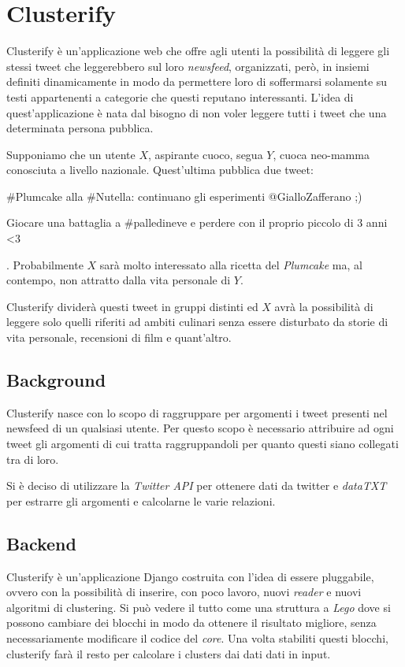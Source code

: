 \chapter{Clusterify}
	Clusterify è un'applicazione web che offre agli utenti la possibilità di leggere gli stessi tweet che leggerebbero sul loro \emph{newsfeed}, organizzati, però, in insiemi definiti dinamicamente in modo da permettere loro di soffermarsi solamente su testi appartenenti a categorie che questi reputano interessanti. L'idea di quest'applicazione è nata dal bisogno di non voler leggere tutti i tweet che una determinata persona pubblica. 

	Supponiamo che un utente $X$, aspirante cuoco, segua $Y$, cuoca neo-mamma conosciuta a livello nazionale. Quest'ultima pubblica due tweet:
	\begin{inparaenum}[\itshape 1\upshape)]
		\item \#Plumcake alla \#Nutella: continuano gli esperimenti @GialloZafferano ;)
		\item Giocare una battaglia a \#palledineve e perdere con il proprio piccolo di 3 anni <3
	\end{inparaenum}.
	Probabilmente $X$ sarà molto interessato alla ricetta del \emph{Plumcake} ma, al contempo, non attratto dalla vita personale di $Y$.

	Clusterify dividerà questi tweet in gruppi distinti ed $X$ avrà la possibilità di leggere solo quelli riferiti ad ambiti culinari senza essere disturbato da storie di vita personale, recensioni di film e quant'altro.

\section{Background}
	Clusterify nasce con lo scopo di raggruppare per argomenti i tweet presenti nel newsfeed di un qualsiasi utente. Per questo scopo è necessario attribuire ad ogni tweet gli argomenti di cui tratta raggruppandoli per quanto questi siano collegati tra di loro. 

	Si è deciso di utilizzare la \emph{Twitter API} per ottenere dati da twitter e \emph{dataTXT} per estrarre gli argomenti e calcolarne le varie relazioni.

	
	

\section{Backend}
	Clusterify è un'applicazione Django\cite{django_project} costruita con l'idea di essere pluggabile, ovvero con la possibilità di inserire, con poco lavoro, nuovi \emph{reader} e nuovi algoritmi di clustering. Si può vedere il tutto come una struttura a \emph{Lego} dove si possono cambiare dei blocchi in modo da ottenere il risultato migliore, senza necessariamente modificare il codice del \emph{core}. Una volta stabiliti questi blocchi, clusterify farà il resto per calcolare i clusters dai dati dati in input.

